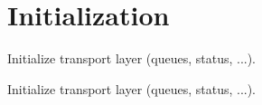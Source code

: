 \hypertarget{group__initialization__group}{}\section{Initialization}
\label{group__initialization__group}


Initialize transport layer (queues, status, ...).  


Initialize transport layer (queues, status, ...). 

